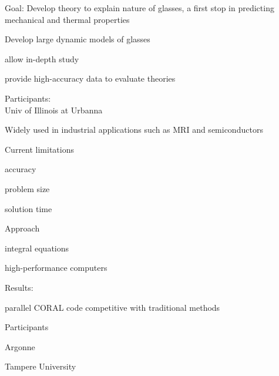 \begin{small}
\begin{mainpts}
\item Goal: Develop theory to explain nature of glasses, a first stop in
predicting mechanical and thermal properties

\item Develop large dynamic models of glasses

\begin{secpts}
\item allow in-depth study
\item provide high-accuracy data to evaluate theories
\end{secpts}

\item Participants:\\
Univ of Illinois at Urbanna
\end{mainpts}
\end{small}
\ve

\begin{small}
\begin{mainpts}
\item Widely used in industrial applications such as MRI and semiconductors
\item Current limitations
\begin{secpts}
\item accuracy
\item problem size
\item solution time
\end{secpts}
\item Approach
\begin{secpts}
\item integral equations
\item high-performance computers
\end{secpts}
\item Results:
\begin{secpts}
\item parallel CORAL code competitive with traditional methods
\end{secpts}
\item Participants
\begin{secpts}
\item Argonne 
\item Tampere University
\end{secpts}
\end{mainpts}
\end{small}
\ve


